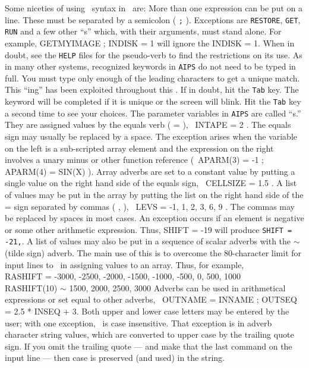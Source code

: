      Some niceties of using \POPS\ syntax in \AIPS\ are:
\xben
\Item More than one expression can be put on a line.  These
    must be separated by a semicolon ( {\tt ;} ).
   Exceptions are {\tt RESTORE}, {\tt GET}, {\tt RUN} and a few other
   ``s'' which, with their arguments, must stand
   alone.  For example, {\us GET\qs MYIMAGE ; INDISK = 1 \CR} will
   ignore the {\us INDISK = 1}. When in doubt, see the {\tt HELP}
   files for the pseudo-verb to find the restrictions on its use.
\Item As in many other systems, recognized keywords in {\tt AIPS}
   do not need to be typed in full.  You must type only enough of the
   leading characters to get a unique match.  This
   ``ing'' has been exploited throughout this
   \Cookbook.  If in doubt, hit the {\tt Tab} key.  The keyword will
   be completed if it is unique or the screen will blink.  Hit the
   {\tt Tab} key a second time to see your choices.
\Item The parameter variables in {\tt AIPS} are called
   ``s.''  They are assigned values by the equals verb (
    {\us =} ), \eg\ {\us INTAPE = 2 \hbox{\CR}}.  The equals sign may
    usually be replaced by a space.  The exception arises when the
    variable on the left is a sub-scripted array element and the
    expression on the right involves a unary minus or other function
    reference (\eg\ {\us APARM(3) = -1 ; APARM(4) = SIN(X) \CR}).
\Item Array adverbs are set to a constant value by putting a single
   value on the right hand side of the equals sign, \eg\ {\us CELLSIZE =
   1.5 \hbox{\CR}}.  A list of values may be put in the array by
   putting the list on the right hand side of the {\us =} sign
   separated by commas ( {\us ,} ), \eg\ {\us LEVS = -1, 1, 2, 3, 6, 9
   \hbox{\CR}}.  The commas may be replaced by spaces in most cases.
   An exception occurs if an element is negative or some other
   arithmetic expression.  Thus, {\us SHIFT = -19 \CR} will
   produce {\tt SHIFT = -21,}.
\Item A list of values may also be put in a sequence of scalar adverbs
   with the $\sim$ (tilde sign) adverb.  The main use of this is to
   overcome the 80-character limit for input lines to \POPS\ in
   assigning values to an array.  Thus, for example,\\
   {\us RASHIFT = -3000, -2500, -2000, -1500, -1000, -500, 0, 500,
        1000 \CR}\\
   {\us RASHIFT(10) $\sim$ 1500, 2000, 2500, 3000 \CR}
\Item Adverbs can be used in arithmetical expressions or set equal to
   other adverbs, \eg\ {\us OUTNAME = INNAME ; OUTSEQ = 2.5 * INSEQ + 3}.
\Item Both upper and lower case letters may be entered by the user;
   with one exception, \AIPS\ is case insensitive.  That exception is
   in adverb character string values, which are converted to upper
   case by the trailing quote sign.  If you omit the trailing quote
   --- and make that the last command on the input line --- then case
   is preserved (and used) in the string.
\xeen

